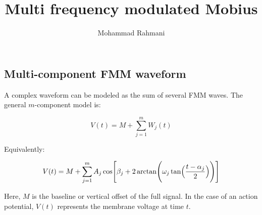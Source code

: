 \documentclass[a4paper]{article}
\title{Multi frequency modulated Mobius}
\date{}
\author{Mohammad Rahmani}
\begin{document}
\maketitle

\subsection{Multi-component FMM waveform}
    
    A complex waveform can be modeled as the sum of several FMM waves.
    The general $m$-component model is:
    
    \begin{equation}
        V(t)
        =
        M
        +
        \sum_{j=1}^{m}
        W_j(t)
    \end{equation}
    
    Equivalently:
    
    \begin{equation}
        V(t)
        =
        M
        +
        \sum_{j=1}^{m}
        A_j
        \cos
        \Biggl[
            \beta_j
            +
            2
            \arctan
            \Biggl(
            \omega_j
            \tan
            \Bigl(
            \frac{t-\alpha_j}{2}
            \Bigr)
            \Biggr)
            \Biggr]
    \end{equation}
    
    Here, $M$ is the baseline or vertical offset of the full signal.
    In the case of an action potential, $V(t)$ represents the membrane voltage at time $t$.
    \cite{rueda-2021-a-novel-wave-decomposition-for-oscillatory-signals}
    
    
    
\end{document}
